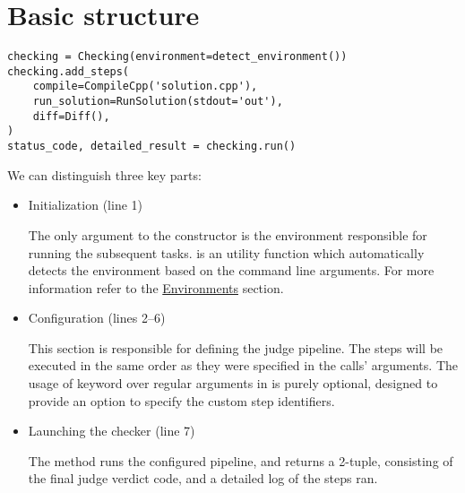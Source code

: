 \section{Basic structure}\label{sec:example}

\begin{verbatim}
checking = Checking(environment=detect_environment())
checking.add_steps(
    compile=CompileCpp('solution.cpp'),
    run_solution=RunSolution(stdout='out'),
    diff=Diff(),
)
status_code, detailed_result = checking.run()
\end{verbatim}

We can distinguish three key parts:
\begin{itemize}
    \item Initialization (line 1)

    The only argument to the  constructor is the environment responsible for running
    the subsequent tasks.
    \hyperref[sec:detect_environment]{} is an utility function which automatically detects
    the environment based on the command line arguments.
    For more information refer to the \hyperref[sec:environments]{Environments} section.
    \item Configuration (lines 2--6)

    This section is responsible for defining the judge pipeline.
    The steps will be executed in the same order as they were specified in the calls' arguments.
    The usage of keyword over regular arguments in \hyperref[sec:add_steps]{} is purely optional, designed to provide an
    option to specify the custom step identifiers.
    \item Launching the checker (line 7)

    The \hyperref[sec:Checking.run]{} method runs the configured pipeline, and returns a 2-tuple, consisting of the final
    judge verdict code, and a detailed log of the steps ran.
\end{itemize}
